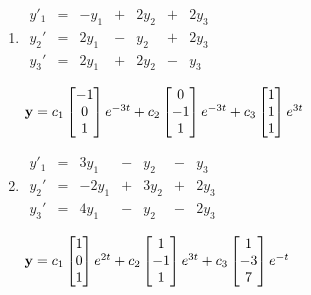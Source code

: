 \documentclass{ximera}
\begin{document}
\begin{problem}
\begin{enumerate}
\item %
 $\begin{array}{ccccccc}y'_1&=&-y_1 &+&2y_2& + &2y_3\\
y_2'&=&2y_1& -&y_2 &+&2y_3\\
y_3'&=&2y_1& +& 2y_2
&-&y_3\end{array}$

${\bf
y}=c_1\begin{bmatrix}-1\\0\\1\end{bmatrix}e^{-3t}+c_2\begin{bmatrix}0\\-1\\1\end{bmatrix}e^{-3t}+c_3\begin{bmatrix}1\\1\\1\end{bmatrix}e^{3t}$

\item %
 $\begin{array}{ccccccc}y'_1&=&3y_1& -& y_2&
-&y_3\\ 
y_2'&=&-2y_1& +& 3y_2& +& 2y_3\\
y_3'&=&4y_1& -&y_2& -&
2y_3\end{array}$

${\bf
y}=c_1\begin{bmatrix}1\\0\\1\end{bmatrix}e^{2t}+c_2\begin{bmatrix}1\\-1\\1\end{bmatrix}e^{3t}+c_3\begin{bmatrix}1\\-3\\7\end{bmatrix}e^{-t}$
\end{enumerate}

\end{problem}
\end{document}
